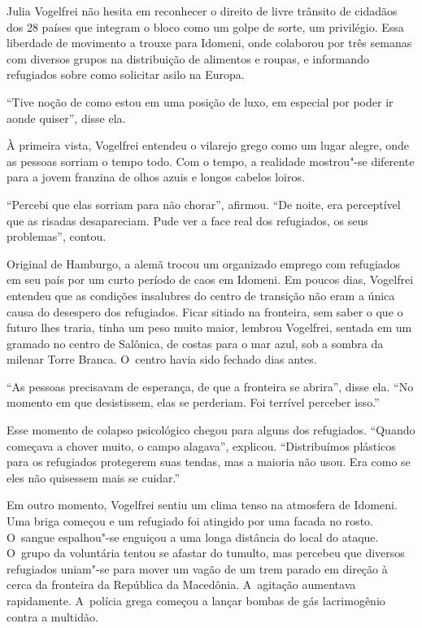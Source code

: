 Julia Vogelfrei não hesita em reconhecer o direito de livre trânsito de
cidadãos dos 28 países que integram o bloco como um golpe de sorte, um
privilégio. Essa liberdade de movimento a trouxe para Idomeni, onde
colaborou por três semanas com diversos grupos na distribuição de
alimentos e roupas, e informando refugiados sobre como solicitar asilo
na Europa.

``Tive noção de como estou em uma posição de luxo, em especial por poder
ir aonde quiser'', disse ela.

À primeira vista, Vogelfrei entendeu o vilarejo grego como um lugar
alegre, onde as pessoas sorriam o tempo todo. Com o tempo, a realidade
mostrou"-se diferente para a jovem franzina de olhos azuis e longos
cabelos loiros.

``Percebi que elas sorriam para não chorar'', afirmou. ``De noite, era
perceptível que as risadas desapareciam. Pude ver a face real dos
refugiados, os seus problemas'', contou.

Original de Hamburgo, a alemã trocou um organizado emprego com
refugiados em seu país por um curto período de caos em Idomeni. Em
poucos dias, Vogelfrei entendeu que as condições insalubres do centro de
transição não eram a única causa do desespero dos refugiados. Ficar
sitiado na fronteira, sem saber o que o futuro lhes traria, tinha um
peso muito maior, lembrou Vogelfrei, sentada em um gramado no centro de
Salônica, de costas para o mar azul, sob a sombra da milenar Torre
Branca. O~centro havia sido fechado dias antes.

``As pessoas precisavam de esperança, de que a fronteira se abrira'',
disse ela. ``No momento em que desistissem, elas se perderiam. Foi
terrível perceber isso.''

Esse momento de colapso psicológico chegou para alguns dos refugiados.
``Quando começava a chover muito, o campo alagava'', explicou.
``Distribuímos plásticos para os refugiados protegerem suas tendas, mas
a maioria não usou. Era como se eles não quisessem mais se cuidar.''

Em outro momento, Vogelfrei sentiu um clima tenso na atmosfera de
Idomeni. Uma briga começou e um refugiado foi atingido por uma facada no
rosto. O~sangue espalhou"-se enguiçou a uma longa distância do local do
ataque. O~grupo da voluntária tentou se afastar do tumulto, mas percebeu
que diversos refugiados uniam"-se para mover um vagão de um trem parado
em direção à cerca da fronteira da República da Macedônia. A~agitação
aumentava rapidamente. A~polícia grega começou a lançar bombas de gás
lacrimogênio contra a multidão.

